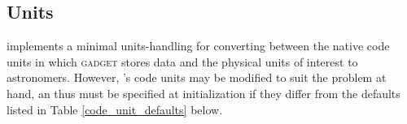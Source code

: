 \subsection{Units}
\label{sec:units}
 implements a minimal units-handling for converting between the native code units in which \textsc{gadget} stores data and the physical units of interest to astronomers.  
However, 's code units may be modified to suit the problem at hand, an thus must be specified at  initialization if they differ from the defaults listed in Table \ref{code_unit_defaults} below.
